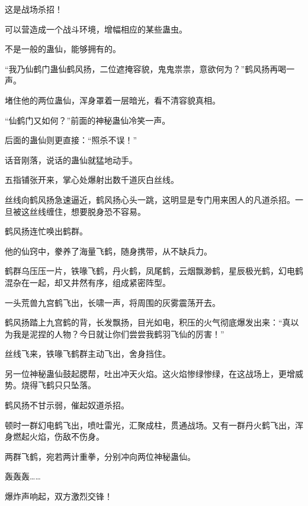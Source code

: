 \begin{this_body}
这是战场杀招！

可以营造成一个战斗环境，增幅相应的某些蛊虫。

不是一般的蛊仙，能够拥有的。

“我乃仙鹤门蛊仙鹤风扬，二位遮掩容貌，鬼鬼祟祟，意欲何为？”鹤风扬再喝一声。

堵住他的两位蛊仙，浑身罩着一层暗光，看不清容貌真相。

“仙鹤门又如何？”前面的神秘蛊仙冷笑一声。

后面的蛊仙则更直接：“照杀不误！”

话音刚落，说话的蛊仙就猛地动手。

五指铺张开来，掌心处爆射出数千道灰白丝线。

丝线向鹤风扬急速逼近，鹤风扬心头一跳，这明显是专门用来困人的凡道杀招。一旦被这丝线缠住，想要脱身恐不容易。

鹤风扬连忙唤出鹤群。

他的仙窍中，豢养了海量飞鹤，随身携带，从不缺兵力。

鹤群乌压压一片，铁喙飞鹤，丹火鹤，凤尾鹤，云烟飘渺鹤，星辰极光鹤，幻电鹤混杂在一起，却又井然有序，组成紧密阵型。

一头荒兽九宫鹤飞出，长啸一声，将周围的灰雾震荡开去。

鹤风扬踏上九宫鹤的背，长发飘扬，目光如电，积压的火气彻底爆发出来：“真以为我是泥捏的人物？今日就让你们尝尝我鹤羽飞仙的厉害！”

丝线飞来，铁喙飞鹤群主动飞出，舍身挡住。

另一位神秘蛊仙鼓起腮帮，吐出冲天火焰。这火焰惨绿惨绿，在这战场上，更增威势。烧得飞鹤只只坠落。

鹤风扬不甘示弱，催起奴道杀招。

顿时一群幻电鹤飞出，喷吐雷光，汇聚成柱，贯通战场。又有一群丹火鹤飞出，浑身燃起火焰，伤敌不伤身。

两群飞鹤，宛若两计重拳，分别冲向两位神秘蛊仙。

轰轰轰……

爆炸声响起，双方激烈交锋！

\end{this_body}

